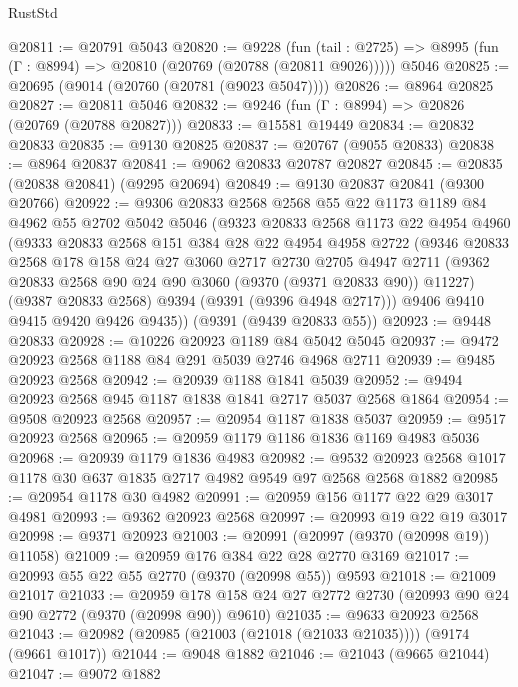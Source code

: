 \begin{lexlean}{RustStd}
\begin{coremodule}
@20811 := @20791 @5043
@20820 := @9228
    (fun (tail : @2725) => @8995 (fun (Γ : @8994) => @20810 (@20769 (@20788 (@20811 @9026)))))
    @5046
@20825 := @20695 (@9014 (@20760 (@20781 (@9023 @5047))))
@20826 := @8964 @20825
@20827 := @20811 @5046
@20832 := @9246 (fun (Γ : @8994) => @20826 (@20769 (@20788 @20827)))
@20833 := @15581 @19449
@20834 := @20832 @20833
@20835 := @9130 @20825
@20837 := @20767 (@9055 @20833)
@20838 := @8964 @20837
@20841 := @9062 @20833 @20787 @20827
@20845 := @20835 (@20838 @20841) (@9295 @20694)
@20849 := @9130 @20837 @20841 (@9300 @20766)
@20922 := @9306
    @20833
    @2568
    @2568
    @55
    @22
    @1173
    @1189
    @84
    @4962
    @55
    @2702
    @5042
    @5046
    (@9323
      @20833
      @2568
      @1173
      @22
      @4954
      @4960
      (@9333
        @20833
        @2568
        @151
        @384
        @28
        @22
        @4954
        @4958
        @2722
        (@9346
          @20833
          @2568
          @178
          @158
          @24
          @27
          @3060
          @2717
          @2730
          @2705
          @4947
          @2711
          (@9362 @20833 @2568 @90 @24 @90 @3060 (@9370 (@9371 @20833 @90)) @11227)
          (@9387 @20833 @2568)
          @9394
          (@9391 (@9396 @4948 @2717)))
        @9406
        @9410
        @9415
        @9420
        @9426
        @9435))
    (@9391 (@9439 @20833 @55))
@20923 := @9448 @20833
@20928 := @10226 @20923 @1189 @84 @5042 @5045
@20937 := @9472 @20923 @2568 @1188 @84 @291 @5039 @2746 @4968 @2711
@20939 := @9485 @20923 @2568
@20942 := @20939 @1188 @1841 @5039
@20952 := @9494 @20923 @2568 @945 @1187 @1838 @1841 @2717 @5037 @2568 @1864
@20954 := @9508 @20923 @2568
@20957 := @20954 @1187 @1838 @5037
@20959 := @9517 @20923 @2568
@20965 := @20959 @1179 @1186 @1836 @1169 @4983 @5036
@20968 := @20939 @1179 @1836 @4983
@20982 := @9532 @20923 @2568 @1017 @1178 @30 @637 @1835 @2717 @4982 @9549 @97 @2568 @2568 @1882
@20985 := @20954 @1178 @30 @4982
@20991 := @20959 @156 @1177 @22 @29 @3017 @4981
@20993 := @9362 @20923 @2568
@20997 := @20993 @19 @22 @19 @3017
@20998 := @9371 @20923
@21003 := @20991 (@20997 (@9370 (@20998 @19)) @11058)
@21009 := @20959 @176 @384 @22 @28 @2770 @3169
@21017 := @20993 @55 @22 @55 @2770 (@9370 (@20998 @55)) @9593
@21018 := @21009 @21017
@21033 := @20959 @178 @158 @24 @27 @2772 @2730 (@20993 @90 @24 @90 @2772 (@9370 (@20998 @90)) @9610)
@21035 := @9633 @20923 @2568
@21043 := @20982 (@20985 (@21003 (@21018 (@21033 @21035)))) (@9174 (@9661 @1017))
@21044 := @9048 @1882
@21046 := @21043 (@9665 @21044)
@21047 := @9072 @1882

\end{coremodule}
\end{lexlean}
